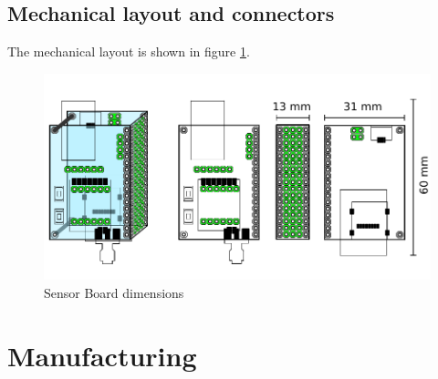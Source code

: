 \subsection{Mechanical layout and connectors}
The mechanical layout is shown in figure \ref{fig:HWdimensions}.

\begin{figure}
	\centering
	\label{fig:HWdimensions}
	\caption{Sensor Board dimensions}
	\includegraphics[scale=1]{img/HWdimensions.pdf}
\end{figure}

\section{Manufacturing}
\label{HWmanufacturing}

